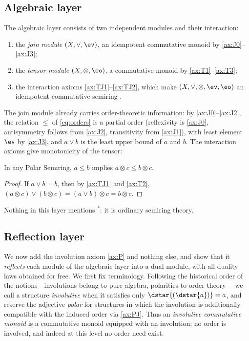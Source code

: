\subsection{Algebraic layer}\label{subsec:algebraic}

The algebraic layer consists of two independent modules and their
interaction:
\begin{enumerate}
  \item the \emph{join module} $(X,\vee,\ev)$, an idempotent commutative
  monoid by \eqref{ax:J0}--\eqref{ax:J3};
  \item the \emph{tensor module} $(X,\otimes,\eo)$, a commutative monoid by
  \eqref{ax:T1}--\eqref{ax:T3};
  \item the interaction axioms \eqref{ax:TJ1}--\eqref{ax:TJ2}, which make
  $(X,\vee,\otimes,\ev,\eo)$ an idempotent commutative semiring
  \citep{Golan1999}.
\end{enumerate}
The join module already carries order-theoretic information: by
\eqref{ax:J0}--\eqref{ax:J2}, the relation $\leq$ of \eqref{eq:orders} is a
partial order (reflexivity is \eqref{ax:J0}, antisymmetry follows from
\eqref{ax:J2}, transitivity from \eqref{ax:J1}), with least element $\ev$ by
\eqref{ax:J3}, and $a \vee b$ is the least upper bound of $a$ and $b$. The
interaction axioms give monotonicity of the tensor:

\begin{lemma}\label{lem:tensor-monotone}
In any Polar Semiring, $a \leq b$ implies $a \otimes c \leq b \otimes c$.
\end{lemma}

\begin{proof}
If $a \vee b = b$, then by \eqref{ax:TJ1} and \eqref{ax:T2},
$(a \otimes c) \vee (b \otimes c) = (a \vee b) \otimes c = b \otimes c$.
\end{proof}

Nothing in this layer mentions ${}^{*}$: it is ordinary semiring theory.

\subsection{Reflection layer}\label{subsec:reflection}

We now add the involution axiom \eqref{ax:P} and nothing else, and show
that it \emph{reflects} each module of the algebraic layer into a dual
module, with all duality laws obtained for free. We first fix terminology.
Following the historical order of the notions---involutions belong to pure
algebra, polarities to order theory \citep{Birkhoff1940}---we call a
structure \emph{involutive} when it satisfies only
$\dstar{(\dstar{a})} = a$, and reserve the adjective \emph{polar} for
structures in which the involution is additionally compatible with the
induced order via \eqref{ax:PJ}. Thus an \emph{involutive commutative
monoid} is a commutative monoid equipped with an involution; no order is
involved, and indeed at this level no order need exist.

